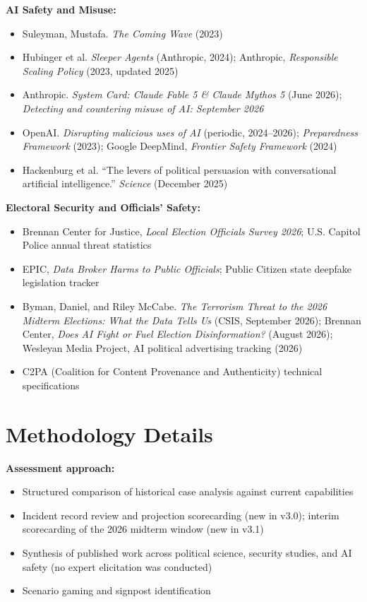 \documentclass[11pt,letterpaper]{article}
\begin{document}
\textbf{AI Safety and Misuse:}
\begin{itemize}[nosep]
  \item Suleyman, Mustafa. \textit{The Coming Wave} (2023)
  \item Hubinger et al. \textit{Sleeper Agents} (Anthropic, 2024); Anthropic, \textit{Responsible Scaling Policy} (2023, updated 2025)
  \item Anthropic. \textit{System Card: Claude Fable 5 \& Claude Mythos 5} (June 2026); \textit{Detecting and countering misuse of AI: September 2026}
  \item OpenAI. \textit{Disrupting malicious uses of AI} (periodic, 2024--2026); \textit{Preparedness Framework} (2023); Google DeepMind, \textit{Frontier Safety Framework} (2024)
  \item Hackenburg et al. ``The levers of political persuasion with conversational artificial intelligence.'' \textit{Science} (December 2025)
\end{itemize}

\textbf{Electoral Security and Officials' Safety:}
\begin{itemize}[nosep]
  \item Brennan Center for Justice, \textit{Local Election Officials Survey 2026}; U.S. Capitol Police annual threat statistics
  \item EPIC, \textit{Data Broker Harms to Public Officials}; Public Citizen state deepfake legislation tracker
  \item Byman, Daniel, and Riley McCabe. \textit{The Terrorism Threat to the 2026 Midterm Elections: What the Data Tells Us} (CSIS, September 2026); Brennan Center, \textit{Does AI Fight or Fuel Election Disinformation?} (August 2026); Wesleyan Media Project, AI political advertising tracking (2026)
  \item C2PA (Coalition for Content Provenance and Authenticity) technical specifications
\end{itemize}

\section{Methodology Details}

\textbf{Assessment approach:}
\begin{itemize}[nosep]
  \item Structured comparison of historical case analysis against current capabilities
  \item Incident record review and projection scorecarding (new in v3.0); interim scorecarding of the 2026 midterm window (new in v3.1)
  \item Synthesis of published work across political science, security studies, and AI safety (no expert elicitation was conducted)
  \item Scenario gaming and signpost identification
\end{itemize}
\end{document}
